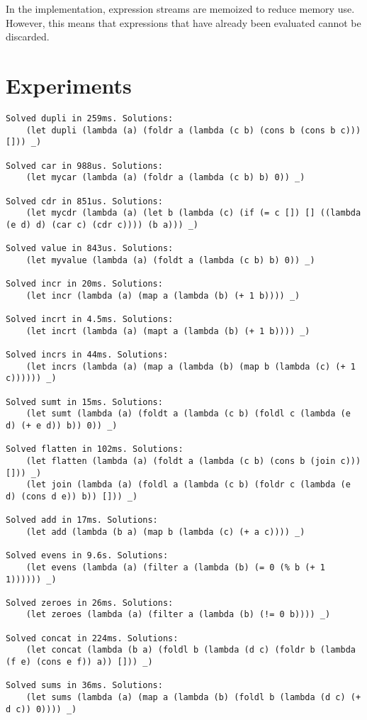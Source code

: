 \documentclass[11pt]{article}
\begin{document}
In the implementation, expression streams are memoized to reduce
memory use. However, this means that expressions that have already
been evaluated cannot be discarded.

\section{Experiments}

\begin{lstlisting}
Solved dupli in 259ms. Solutions:
	(let dupli (lambda (a) (foldr a (lambda (c b) (cons b (cons b c))) [])) _)

Solved car in 988us. Solutions:
	(let mycar (lambda (a) (foldr a (lambda (c b) b) 0)) _)

Solved cdr in 851us. Solutions:
	(let mycdr (lambda (a) (let b (lambda (c) (if (= c []) [] ((lambda (e d) d) (car c) (cdr c)))) (b a))) _)

Solved value in 843us. Solutions:
	(let myvalue (lambda (a) (foldt a (lambda (c b) b) 0)) _)

Solved incr in 20ms. Solutions:
	(let incr (lambda (a) (map a (lambda (b) (+ 1 b)))) _)

Solved incrt in 4.5ms. Solutions:
	(let incrt (lambda (a) (mapt a (lambda (b) (+ 1 b)))) _)

Solved incrs in 44ms. Solutions:
	(let incrs (lambda (a) (map a (lambda (b) (map b (lambda (c) (+ 1 c)))))) _)

Solved sumt in 15ms. Solutions:
	(let sumt (lambda (a) (foldt a (lambda (c b) (foldl c (lambda (e d) (+ e d)) b)) 0)) _)

Solved flatten in 102ms. Solutions:
	(let flatten (lambda (a) (foldt a (lambda (c b) (cons b (join c))) [])) _)
	(let join (lambda (a) (foldl a (lambda (c b) (foldr c (lambda (e d) (cons d e)) b)) [])) _)

Solved add in 17ms. Solutions:
	(let add (lambda (b a) (map b (lambda (c) (+ a c)))) _)

Solved evens in 9.6s. Solutions:
	(let evens (lambda (a) (filter a (lambda (b) (= 0 (% b (+ 1 1)))))) _)

Solved zeroes in 26ms. Solutions:
	(let zeroes (lambda (a) (filter a (lambda (b) (!= 0 b)))) _)

Solved concat in 224ms. Solutions:
	(let concat (lambda (b a) (foldl b (lambda (d c) (foldr b (lambda (f e) (cons e f)) a)) [])) _)

Solved sums in 36ms. Solutions:
	(let sums (lambda (a) (map a (lambda (b) (foldl b (lambda (d c) (+ d c)) 0)))) _)


\end{lstlisting}
\end{document}
